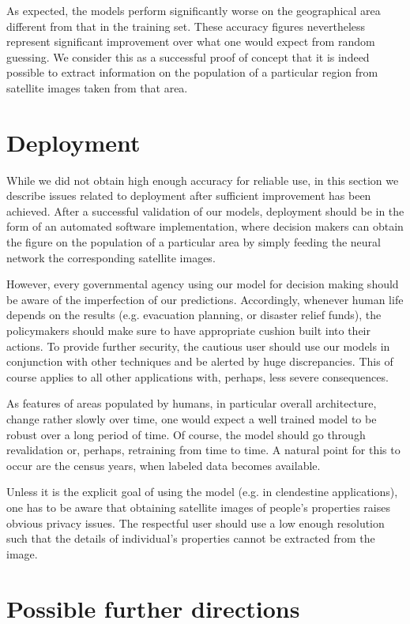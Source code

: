 \documentclass{article}
\begin{document}
As expected, the models perform significantly worse on the geographical area different from that in the training set. These accuracy figures nevertheless represent significant improvement over what one would expect from random guessing. We consider this as a successful proof of concept that it is indeed possible to extract information on the population of a particular region from satellite images taken from that area.

\section{Deployment}
While we did not obtain high enough accuracy for reliable use, in this section we describe issues related to deployment after sufficient improvement has been achieved. After a successful validation of our models, deployment should be in the form of an automated software implementation, where decision makers can obtain the figure on the population of a particular area by simply feeding the neural network the corresponding satellite images.

However, every governmental agency using our model for decision making should be aware of the imperfection of our predictions. Accordingly, whenever human life depends on the results (e.g. evacuation planning, or disaster relief funds), the policymakers should make sure to have appropriate cushion built into their actions. To provide further security, the cautious user should use our models in conjunction with other techniques and be alerted by huge discrepancies. This of course applies to all other applications with, perhaps, less severe consequences.

As features of areas populated by humans, in particular overall architecture, change rather slowly over time, one would expect a well trained model to be robust over a long period of time. Of course, the model should go through revalidation or, perhaps, retraining from time to time. A natural point for this to occur are the census years, when labeled data becomes available.

Unless it is the explicit goal of using the model (e.g. in clendestine applications), one has to be aware that obtaining satellite images of people's properties raises obvious privacy issues. The respectful user should use a low enough resolution such that the details of individual's properties cannot be extracted from the image.

\section{Possible further directions}
\end{document}
